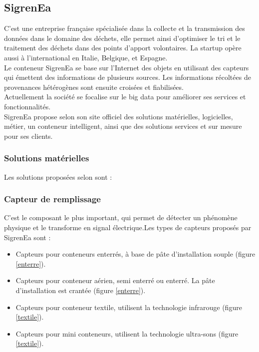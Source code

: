 \documentclass[a4paper,12pt]{report}
\begin{document}
\subsection{SigrenEa}
C’est une entreprise française spécialisée dans la collecte et la transmission des données dans le domaine des déchets, elle permet ainsi d’optimiser le tri et le traitement des déchets dans des points d’apport volontaires. La startup opère aussi à l’international en Italie, Belgique, et Espagne.\\
 
Le conteneur SigrenEa se base sur l’Internet des objets en utilisant des capteurs qui émettent des informations de plusieurs sources. Les informations récoltées de provenances hétérogènes sont ensuite croisées et fiabilisées.\\
 
Actuellement la société se focalise sur le big data pour améliorer ses services et fonctionnalités.\\
 
SigrenEa propose selon son site officiel \cite{ref3} des solutions matérielles, logicielles, métier, un conteneur intelligent, ainsi que des solutions services et sur mesure pour ses clients.


\subsubsection{Solutions matérielles }
Les solutions proposées selon \cite{ref3} sont :
\subsubsection*{Capteur de remplissage }
C'est le composant le plus important, qui permet de détecter un phénomène physique et le transforme en signal électrique.Les types de capteurs proposés par SigrenEa sont :\\
\begin{itemize}
\item Capteurs pour conteneurs enterrés, à base de pâte d'installation souple (figure \ref{enterre}).
\item Capteurs pour conteneur aérien, semi enterré ou enterré. La pâte d'installation est crantée (figure \ref{enterre}).
\item Capteurs pour conteneur textile, utilisent la technologie infrarouge (figure \ref{textile}).
\item Capteurs pour mini conteneurs, utilisent la technologie ultra-sons (figure \ref{textile}).
\end{itemize}
\end{document}
